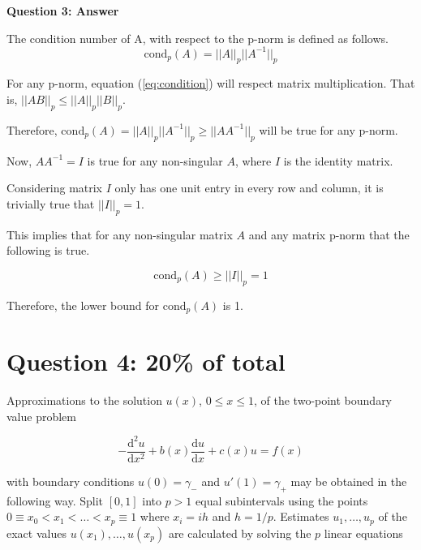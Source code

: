 \documentclass[12pt]{article}
\begin{document}
\textbf{Question 3: Answer}

The condition number of A, with respect to the p-norm is defined as follows.
\begin{equation}\label{eq:condition}
\mathrm{cond}_p(A) = \lvert\lvert A \rvert \rvert_p \lvert \lvert A^{-1} \rvert \rvert_p
\end{equation}

For any p-norm, equation (\ref{eq:condition}) will respect matrix multiplication. That is, $\lvert\lvert AB \rvert \rvert_p \leq \lvert\lvert A \rvert \rvert_p \lvert \lvert B \rvert \rvert_p$.

Therefore,
$\mathrm{cond}_p(A) = \lvert\lvert A \rvert \rvert_p \lvert \lvert A^{-1} \rvert \rvert_p \geq \lvert\lvert AA^{-1} \rvert \rvert_p$ will be true for any p-norm.

Now, $AA^{-1} = I$ is true for any non-singular $A$, where $I$ is the identity matrix.

Considering matrix $I$ only has one unit entry in every row and column, it is trivially true that $\lvert\lvert I \rvert \rvert_p = 1$.

This implies that for any non-singular matrix $A$ and any matrix p-norm that the following is true.

\begin{equation}
\mathrm{cond}_p(A) \geq \lvert\lvert I \rvert \rvert_p = 1
\end{equation}

Therefore, the lower bound for $\mathrm{cond}_p(A)$ is 1.

\newpage
\section*{Question 4: 20\% of total}
Approximations to the solution $u(x)$, $0 \leq x \leq 1$, of the two-point boundary value problem

\begin{equation}
-\frac{\mathrm{d}^2 u}{\mathrm{d}x^2}+b(x)\frac{\mathrm{d} u}{\mathrm{d} x}+c(x)u = f(x)
\end{equation}

with boundary conditions $u(0) = \gamma_-$ and $u'(1) = \gamma_+$ may be obtained in the following way. Split $[0,1]$ into $p > 1$ equal subintervals using the points $0 \equiv x_0 < x_1 < \ldots < x_p \equiv 1$ where $x_i = ih$ and $h = 1/p$. Estimates $u_1, \ldots, u_p$ of the exact values $u(x_1), \ldots, u(x_p)$ are calculated by solving the $p$ linear equations
\end{document}
